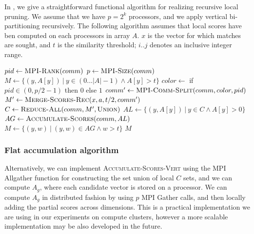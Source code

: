 \documentclass{comjnl}
\newcommand{\algo}[1]{\textsc{#1}} %
\begin{document}
In , we give a straightforward
functional algorithm for realizing recursive local pruning.  We assume
that we have $p=2^k$ processors, and we apply vertical
bi-partitioning recursively. The following algorithm assumes that
local scores have ben computed on each processors in array $A$.  $x$
is the vector for which matches are sought, and $t$ is the similarity
threshold; $i..j$ denotes an inclusive integer range.

\begin{algorithm}
  \caption{$\algo{Merge-Scores-Rec}(x, A, t, comm)$}
  \label{alg:merge-scores-rec}
  \begin{algorithmic}[1]
    \STATE $ pid \gets \algo{MPI-Rank}(comm)$ \STATE $ p \gets
    \algo{MPI-Size}(comm)$  \STATE $M \gets \{ (y, A[y]) \ | \
    {y \in (0...|A|-1)} \land {A[y]>t} \}$ \ELSE \STATE $color \gets $
    if $pid \in (0, p/2-1)$ then $0$ else $1$ \STATE $comm' \gets
    \algo{MPI-Comm-Split}(comm, color, pid)$ \STATE $M' \gets
    \algo{Merge-Scores-Rec}(x, a, t/2, comm')$ \STATE $C \gets
    \algo{Reduce-All}(comm, M', \algo{Union})$ \STATE $AL \gets \{ (y,
    A[y]) \ |\ {y \in C} \land {A[y]>0}\}$ \STATE $AG \gets
    \algo{Accumulate-Scores}(comm, AL)$ \STATE $M \gets \{ (y, w) \ |\
    {(y,w) \in AG} \land {w>t}\}$ \RETURN $M$
    \ENDIF
  \end{algorithmic}
\end{algorithm}

\subsubsection{Flat accumulation algorithm}
\label{sec:flataccum}

Alternatively, we can implement \algo{Accumulate-Scores-Vert} using
the MPI Allgather function for constructing the set union of local $C$
sets, and we can compute $A_g$, where each candidate vector is stored
on a processor. We can compute $A_g$ in distributed fashion by using
$p$ MPI Gather calls, and then locally adding the partial scores
across dimensions.  This is a practical implementation we are using in
our experiments on compute clusters, however a more scalable
implementation may be also developed in the future.
\end{document}
